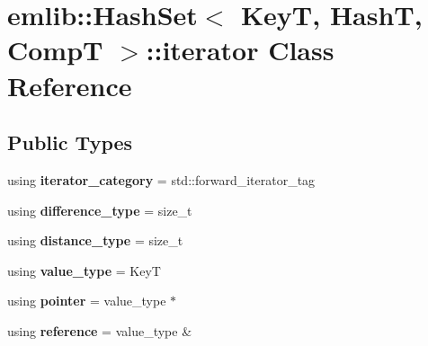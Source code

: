 \hypertarget{classemlib_1_1_hash_set_1_1iterator}{\section{emlib\+:\+:Hash\+Set$<$ Key\+T, Hash\+T, Comp\+T $>$\+:\+:iterator Class Reference}
\label{classemlib_1_1_hash_set_1_1iterator}
}
\subsection*{Public Types}
\begin{DoxyCompactItemize}
\item 
\hypertarget{classemlib_1_1_hash_set_1_1iterator_a69af29529d085f44809d77e67d036fb7}{using {\bfseries iterator\+\_\+category} = std\+::forward\+\_\+iterator\+\_\+tag}\label{classemlib_1_1_hash_set_1_1iterator_a69af29529d085f44809d77e67d036fb7}

\item 
\hypertarget{classemlib_1_1_hash_set_1_1iterator_a7d59c912800ffd292ff8cf1ae78af99a}{using {\bfseries difference\+\_\+type} = size\+\_\+t}\label{classemlib_1_1_hash_set_1_1iterator_a7d59c912800ffd292ff8cf1ae78af99a}

\item 
\hypertarget{classemlib_1_1_hash_set_1_1iterator_a7f6ede0a87277d38492f729434409eb9}{using {\bfseries distance\+\_\+type} = size\+\_\+t}\label{classemlib_1_1_hash_set_1_1iterator_a7f6ede0a87277d38492f729434409eb9}

\item 
\hypertarget{classemlib_1_1_hash_set_1_1iterator_ac200afa0b3308030d90214cf27ea1611}{using {\bfseries value\+\_\+type} = Key\+T}\label{classemlib_1_1_hash_set_1_1iterator_ac200afa0b3308030d90214cf27ea1611}

\item 
\hypertarget{classemlib_1_1_hash_set_1_1iterator_af31b6d66e9ce1bcdaef1eff25d48b351}{using {\bfseries pointer} = value\+\_\+type $\ast$}\label{classemlib_1_1_hash_set_1_1iterator_af31b6d66e9ce1bcdaef1eff25d48b351}

\item 
\hypertarget{classemlib_1_1_hash_set_1_1iterator_a24abd72780f2ebfadd2bfd5ac82fed3e}{using {\bfseries reference} = value\+\_\+type \&}\label{classemlib_1_1_hash_set_1_1iterator_a24abd72780f2ebfadd2bfd5ac82fed3e}

\end{DoxyCompactItemize}

